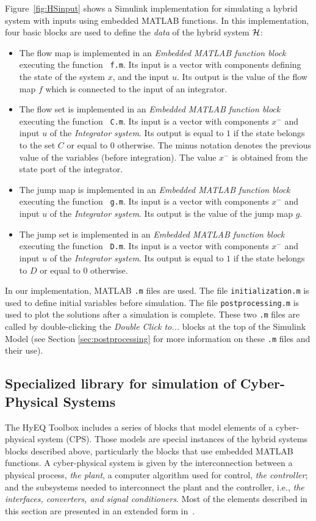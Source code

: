 \documentclass{article}
\begin{document}
Figure~\ref{fig:HSinput} shows a Simulink implementation for simulating a hybrid system with inputs using embedded MATLAB functions. In this implementation, four basic blocks are used to define the {\em data} of the hybrid system $\mathcal{H}$:
\begin{itemize}
\item The flow map is implemented in an {\em Embedded MATLAB function block} executing the function {\tt
f.m}. Its input is a vector with components defining the state of the system $x$, and the input $u$.
Its output is the value of the flow map $f$ which is connected to the  input of an integrator.
\item The flow set is implemented in an {\em Embedded MATLAB function block} executing the function {\tt
C.m}. Its input is a vector with components $x^-$ and input $u$ of the {\em Integrator system}. Its output is equal to $1$ if the state belongs to the set $C$ or equal to $0$ otherwise.
The minus notation denotes the previous value of the variables (before integration). The value $x^-$ is obtained from the state port of the integrator.
\item The jump map is implemented in an {\em Embedded MATLAB function block} executing the function {\tt
g.m}. Its input is a vector with components $x^-$ and input $u$ of the {\em Integrator system}. Its output is the value of the jump map $g$.
\item The jump set is implemented in an {\em Embedded MATLAB function block} executing the function {\tt
D.m}. Its input is a vector with components $x^-$ and input $u$ of the {\em Integrator system}. Its output is equal to $1$ if the state belongs to $D$ or equal to $0$ otherwise.
\end{itemize}


In our implementation, MATLAB {\tt .m} files are used. The file {\tt initialization.m} is used to define initial variables before simulation. The file {\tt postprocessing.m} is used to plot the solutions after a simulation is complete. These two {\tt .m} files are called by double-clicking the {\em Double Click to...} blocks at the top of the Simulink Model (see Section \ref{sec:postprocessing} for more information on these {\tt .m} files and their use).


\subsection{Specialized library for simulation of Cyber-Physical Systems}
\label{sec:CPS}
The HyEQ Toolbox includes a series of blocks that model elements of a cyber-physical system (CPS). Those models are special instances of the hybrid systems blocks described above, particularly the blocks that use embedded MATLAB functions.
A cyber-physical system is given by the interconnection between a physical process, {\em the plant}, a computer algorithm used for control, {\em the controller}; and  the subsystems needed to interconnect the plant and the controller, i.e., 
{\em the interfaces,  converters, and signal conditioners}. Most of the elements described in this section are presented in an extended form in~\cite{San17}.
\end{document}
